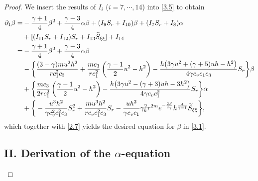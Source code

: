 \documentclass[11pt,reqno]{article}
\numberwithin{equation}{section}
\begin{document}
\begin{proof}
We insert the results of $I_i$ ($i=7,\cdots,14$) into \eqref{3.5} to obtain
\begin{align*}
\partial_1\beta
=& -\frac{\gamma+1}{4}\beta^{2}
+ \frac{\gamma-3}{4}\alpha\beta +(I_{9} S_{r} +I_{10})\beta +(I_{7} S_{r}+I_{8})\alpha \notag \\
&+[(I_{11} S_{r} +I_{12})S_r +I_{13} \widetilde{S}_{\xi\xi}] +I_{14} \\
=& -\frac{\gamma+1}{4}\beta^{2}
+ \frac{\gamma-3}{4}\alpha\beta \\
&-\bigg\{ \frac{(3-\gamma) m u^2 h^2}{r c_1^2 c_3}+ \frac{m c_3}{r c_1^2}\left( \frac{\gamma-1}{2}u^{2} - h^{2} \right)
 -\frac{h\big(3\gamma u^2 + (\gamma+5)u h - h^2\big)}{4\gamma c_v c_1 c_3} S_r\bigg\}\beta \\
&+\bigg\{ \frac{mc_3}{2r c_1^2} \left( \frac{\gamma-1}{2}u^{2} - h^{2} \right)
 -\frac{h\big( 3\gamma u^2-(\gamma+3)u h-3h^2  \big)}{4\gamma c_v c_1^2 } S_r \bigg\}\alpha \\
&+\bigg\{-\frac{u^3 h^2}{\gamma c_v^2 c_1^{2} c_3}S_r^2
+ \frac{mu^3 h^2 }{r c_v c_1^2 c_3} S_r
-\frac{u h^2}{\gamma c_v c_1}\gamma_k^2 r^{2m} e^{-\frac{2S}{c_\gamma}} h^{\frac{4}{\gamma-1}} \widetilde{S}_{\xi\xi}\bigg\},
\end{align*}
which together with \eqref{2.7} yields the desired equation for $\beta$ in \eqref{3.1}.



\subsection*{II. Derivation of the $\alpha$-equation}


\end{proof}
\end{document}
